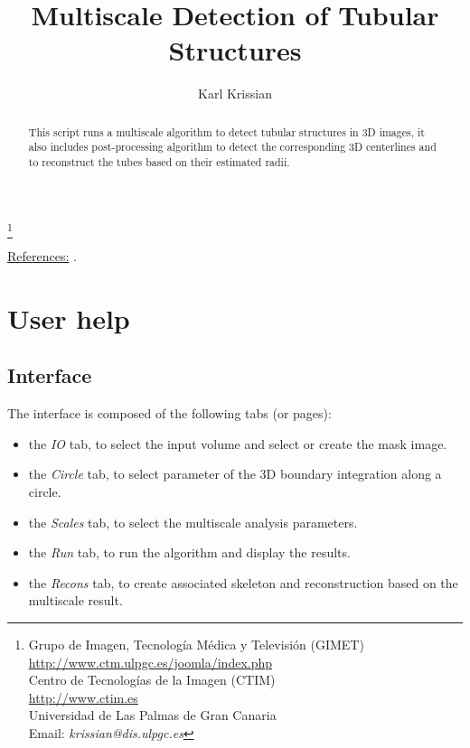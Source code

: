 \documentclass{article}
\begin{document}
\title{Multiscale Detection of Tubular Structures}
\author{ Karl Krissian
}
\thanks{Grupo de Imagen, Tecnolog\'ia M\'edica y Televisi\'on (GIMET)\\
\url{http://www.ctm.ulpgc.es/joomla/index.php}\\
Centro de Tecnolog\'ias de la Imagen (CTIM)\\
\url{http://www.ctim.es}\\
Universidad de Las Palmas de Gran Canaria\\
Email: {\it krissian@dis.ulpgc.es}
}


\maketitle


\begin{abstract}
This script runs a multiscale algorithm to detect tubular structures in 3D images, it also includes post-processing algorithm to detect the corresponding 3D centerlines and to reconstruct the tubes based on their estimated radii.
\end{abstract}

\underline{References:} \cite{Krissian2000b,Krissian_al_2003,KA09}.

\tableofchildlinks


\section{User help}

\subsection{Interface}
The interface is composed of the following tabs (or pages):
\begin{itemize}
 \item the {\em IO} tab, to select the input volume and select or create the mask image.
 \item the {\em Circle} tab, to select parameter of the 3D boundary integration along a circle.
 \item the {\em Scales} tab, to select the multiscale analysis parameters.
 \item the {\em Run} tab, to run the algorithm and display the results.
 \item the {\em Recons} tab, to create associated skeleton and reconstruction based on the multiscale result.
\end{itemize}
\end{document}
